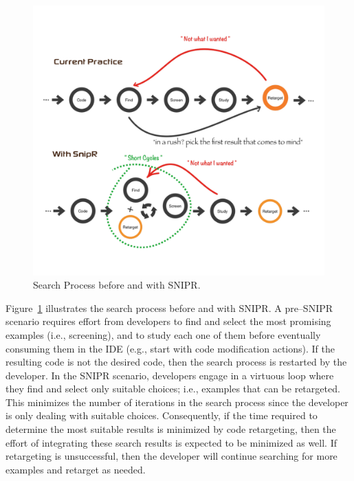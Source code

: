 \begin{figure}[!ht]
    \centering
    \includegraphics[width=\textwidth]{images/searchprocess}
    \caption{Search Process before and with \uppercase{SnipR}.}
    \label{fig:retargeting}
\end{figure}

Figure~\ref{fig:retargeting} illustrates the search process before and with \uppercase{SnipR}. A pre--\uppercase{SnipR} scenario requires effort from developers to find and select the most promising examples (i.e., screening), and to study each one of them before eventually consuming them in the IDE (e.g., start with code modification actions). If the resulting code is not the desired code, then the search process is restarted by the developer. In the \uppercase{SnipR} scenario, developers engage in a virtuous loop where they find and select only suitable choices; i.e., examples that can be retargeted. This minimizes the number of iterations in the search process since the developer is only dealing with suitable choices. Consequently, if the time required to determine the most suitable results is minimized by code retargeting, then the effort of integrating these search results is expected to be minimized as well. If retargeting is unsuccessful, then the developer will continue searching for more examples and retarget as needed. 

